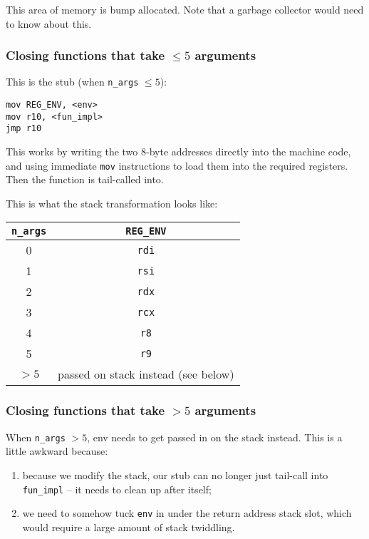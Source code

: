\documentclass[12pt,a4paper,twoside,openright]{report}
\begin{document}
This area of memory is bump allocated. Note that a garbage collector would need to know about this.

\subsubsection{Closing functions that take $\le 5$ arguments}

This is the stub (when \lstinline{n_args} $\le 5$):

\begin{lstlisting}
mov REG_ENV, <env>
mov r10, <fun_impl>
jmp r10
\end{lstlisting}

This works by writing the two 8-byte addresses directly into the machine code, and using immediate \lstinline{mov} instructions to load them into the required registers. Then the function is tail-called into.

This is what the stack transformation looks like: %

\begin{tabular}{ c | c }
  \lstinline!n_args! & \lstinline!REG_ENV! \\
  \hline
  0 & \lstinline!rdi! \\
  1 & \lstinline!rsi! \\
  2 & \lstinline!rdx! \\
  3 & \lstinline!rcx! \\
  4 & \lstinline!r8! \\
  5 & \lstinline!r9! \\
  $> 5$ & passed on stack instead (see below) \\
\end{tabular}

\subsubsection{Closing functions that take $> 5$ arguments}

When \lstinline{n_args} $> 5$, env needs to get passed in on the stack instead.
This is a little awkward because:
\begin{enumerate}
    \item because we modify the stack, our stub can no longer just tail-call into \lstinline{fun_impl} -- it needs to clean up after itself;
  \item we need to somehow tuck \lstinline{env} in under the return address stack slot, which would require a large amount of stack twiddling.
\end{enumerate}
\end{document}
